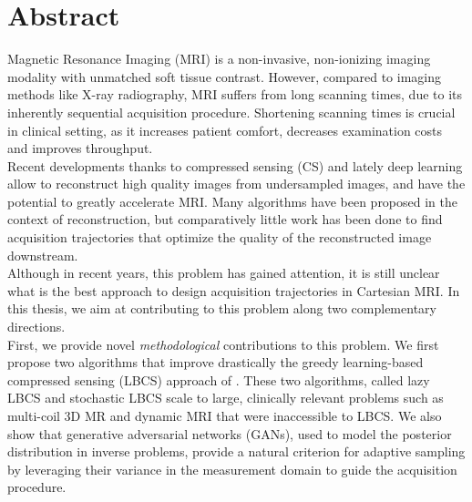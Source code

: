

\cleardoublepage
\chapter*{Abstract}

Magnetic Resonance Imaging (MRI) is a non-invasive, non-ionizing imaging modality with unmatched soft tissue contrast. However, compared to imaging methods like X-ray radiography, MRI suffers from long scanning times, due to its inherently sequential acquisition procedure. Shortening scanning times is crucial in clinical setting, as it increases patient comfort, decreases examination costs and improves throughput.\\

Recent developments thanks to compressed sensing (CS) and lately deep learning allow to reconstruct high quality images from undersampled images, and have the potential to greatly accelerate MRI. Many algorithms have been proposed in the context of reconstruction, but comparatively little work has been done to
find acquisition trajectories that optimize the quality of the reconstructed image downstream.\\ %
 
Although in recent years, this problem has gained attention, it is still unclear what is the best approach to design acquisition trajectories in Cartesian MRI. %
In this thesis, we aim at contributing to this problem along two complementary directions.\\

First, we provide novel \textit{methodological} contributions to this problem. We first propose two algorithms that improve drastically the greedy learning-based compressed sensing (LBCS) approach of \citet{gozcu2018learning}. These two algorithms, called lazy LBCS and stochastic LBCS scale to large, clinically relevant problems such as multi-coil 3D MR and dynamic MRI that were inaccessible to LBCS. %
We also show that generative adversarial networks (GANs), used to model the posterior distribution in inverse problems, provide a natural criterion for adaptive sampling by leveraging their variance in the measurement domain to guide the acquisition procedure.\\ 

